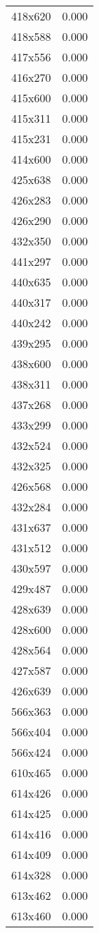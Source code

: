 \begin{table}
\begin{tabular}{lr}
418x620 & 0.000 \\
418x588 & 0.000 \\
417x556 & 0.000 \\
416x270 & 0.000 \\
415x600 & 0.000 \\
415x311 & 0.000 \\
415x231 & 0.000 \\
414x600 & 0.000 \\
425x638 & 0.000 \\
426x283 & 0.000 \\
426x290 & 0.000 \\
432x350 & 0.000 \\
441x297 & 0.000 \\
440x635 & 0.000 \\
440x317 & 0.000 \\
440x242 & 0.000 \\
439x295 & 0.000 \\
438x600 & 0.000 \\
438x311 & 0.000 \\
437x268 & 0.000 \\
433x299 & 0.000 \\
432x524 & 0.000 \\
432x325 & 0.000 \\
426x568 & 0.000 \\
432x284 & 0.000 \\
431x637 & 0.000 \\
431x512 & 0.000 \\
430x597 & 0.000 \\
429x487 & 0.000 \\
428x639 & 0.000 \\
428x600 & 0.000 \\
428x564 & 0.000 \\
427x587 & 0.000 \\
426x639 & 0.000 \\
566x363 & 0.000 \\
566x404 & 0.000 \\
566x424 & 0.000 \\
610x465 & 0.000 \\
614x426 & 0.000 \\
614x425 & 0.000 \\
614x416 & 0.000 \\
614x409 & 0.000 \\
614x328 & 0.000 \\
613x462 & 0.000 \\
613x460 & 0.000 \\

\end{tabular}
\end{table}
